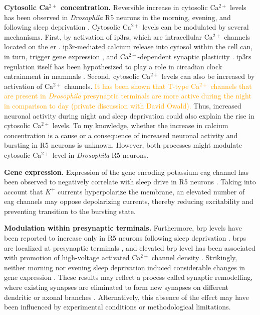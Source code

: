 \documentclass[../main.tex]{subfiles}
\begin{document}
\textbf{Cytosolic Ca$^{2+}$ concentration.}
Reversible increase in cytosolic Ca$^{2+}$ levels has been observed in \textit{Drosophila} R5 neurons in the morning, evening, and following sleep deprivation \parencite{andreaniCircadianProgrammingEllipsoid2022,liuSleepDriveEncoded2016}. Cytosolic Ca$^{2+}$ levels can be modulated by several mechanisms. First, by activation of \glspl{ip3r}, which are intracellular Ca$^{2+}$ channels located on the \gls{er} \parencite{schmitzStructuralBasisActivation2022}. \gls{ip3r}-mediated calcium release into cytosol within the cell can, in turn, trigger gene expression \parencite{schmitzStructuralBasisActivation2022}, and Ca$^{2+}$-dependent synaptic plasticity \parencite{liuSleepDriveEncoded2016}. \glspl{ip3r} regulation itself has been hypothesized to play a role in circadian clock entrainment in mammals \parencite{hamadaRoleInositolTrisphosphateinduced1999}. Second, cytosolic Ca$^{2+}$ levels can also be increased by activation of Ca$^{2+}$ channels. \textcolor{orange}{It has been shown that T-type Ca$^{2+}$ channels that are present in \textit{Drosophila} presynaptic terminals are more active during the night in comparison to day (private discussion with David Owald).}
Thus, increased neuronal activity during night and sleep deprivation could also explain the rise in cytosolic Ca$^{2+}$ levels. To my knowledge, whether the increase in calcium concentration is a cause or a consequence of increased neuronal activity and bursting in R5 neurons is unknown. However, both processes might modulate cytosolic Ca$^{2+}$ level in \textit{Drosophila} R5 neurons.

\textbf{Gene expression.}
Expression of the gene encoding potassium \gls{eag} channel has been observed to negatively correlate with sleep drive in R5 neurons \parencite{doppSinglecellTranscriptomicsReveals2024}. Taking into account that $K^{+}$ currents hyperpolarize the membrane, an elevated number of \gls{eag} channels may oppose depolarizing currents, thereby reducing excitability and preventing transition to the bursting state.

\textbf{Modulation within presynaptic terminals.}
Furthermore, \gls{brp} levels have been reported to increase only in R5 neurons following sleep deprivation \parencite{liuSleepDriveEncoded2016}. \glspl{brp} are localized at presynaptic terminals \parencite{waghBruchpilotProteinHomology2006}, and elevated \gls{brp} level has been associated with promotion of high-voltage activated Ca$^{2+}$ channel density \parencite{kittelBruchpilotPromotesActive2006}. Strikingly, neither morning nor evening sleep deprivation induced considerable changes in gene expression \parencite{andreaniCircadianProgrammingEllipsoid2022}. These results may reflect a process called synaptic remodelling, where existing synapses are eliminated to form new synapses on different dendritic or axonal branches \parencite{kurupNeuralCircuitRewiring2016}. Alternatively, this absence of the effect may have been influenced by experimental conditions or methodological limitations.
\end{document}
